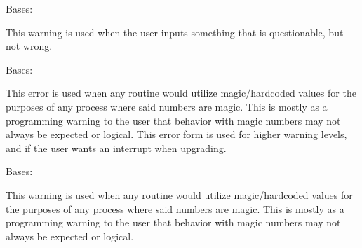 \documentclass[letterpaper,10pt,english]{sphinxmanual}
\begin{document}

\begin{fulllineitems}
\label{\detokenize{docstrings/ifa_smeargle.core.error:ifa_smeargle.core.error.InputWarning}}
Bases: {\hyperref[\detokenize{docstrings/ifa_smeargle.core.error:ifa_smeargle.core.error.Ifas_Warning}]{}}

This warning is used when the user inputs something that is
questionable, but not wrong.

\end{fulllineitems}


\begin{fulllineitems}
\label{\detokenize{docstrings/ifa_smeargle.core.error:ifa_smeargle.core.error.MagicError}}
Bases: {\hyperref[\detokenize{docstrings/ifa_smeargle.core.error:ifa_smeargle.core.error.Ifas_Exception}]{}}

This error is used when any routine would utilize
magic/hard\sphinxhyphen{}coded values for the purposes of any process where
said numbers are magic. This is mostly as a programming warning
to the user that behavior with magic numbers may not always be
expected or logical. This error form is used for higher warning
levels, and if the user wants an interrupt when upgrading.

\end{fulllineitems}


\begin{fulllineitems}
\label{\detokenize{docstrings/ifa_smeargle.core.error:ifa_smeargle.core.error.MagicWarning}}
Bases: {\hyperref[\detokenize{docstrings/ifa_smeargle.core.error:ifa_smeargle.core.error.Ifas_Warning}]{}}

This warning is used when any routine would utilize
magic/hard\sphinxhyphen{}coded values for the purposes of any process where
said numbers are magic. This is mostly as a programming
warning to the user that behavior with magic numbers may not
always be expected or logical.

\end{fulllineitems}
\end{document}
